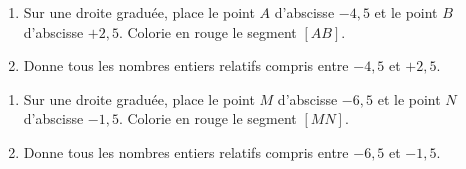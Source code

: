 \begin{myenumerate}
\item
  \begin{enumerate}
  \item Sur une droite graduée, place le point $A$ d'abscisse $-4,5$ et le point $B$ d'abscisse $+2,5$. Colorie en rouge le segment $[AB]$.
  \item Donne tous les nombres entiers relatifs compris entre $-4,5$ et $+2,5$.
  \end{enumerate}
  \item 
  \begin{enumerate}
  \item Sur une droite graduée, place le point $M$ d'abscisse $-6,5$ et le point $N$ d'abscisse $-1,5$. Colorie en rouge le segment $[MN]$.
  \item Donne tous les nombres entiers relatifs compris entre $-6,5$ et $-1,5$.
  \end{enumerate}
\end{myenumerate}